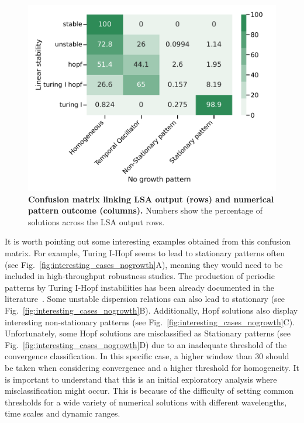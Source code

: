 \begin{figure}[H] %
    \centering
    \includegraphics[width=1\textwidth]{chapters/Chapter 1/lsa_vs_numerical_confusion_variant0-11-12} %
    \caption{\textbf{Confusion matrix linking LSA output (rows) and numerical pattern outcome (columns).} Numbers show the percentage of solutions across the LSA output rows.}
    \label{fig:lsa_numerical_confusion} %
\end{figure}

It is worth pointing out some interesting examples obtained from this confusion matrix.
For example, Turing I-Hopf seems to lead to stationary patterns often (see Fig.~\ref{fig:interesting_cases_nogrowth}A), meaning they would need to be included in high-throughput robustness studies.
The production of periodic patterns by Turing I-Hopf instabilities has been already documented in the literature~\cite{Liu2007}.
Some unstable dispersion relations can also lead to stationary (see Fig.~\ref{fig:interesting_cases_nogrowth}B).
Additionally, Hopf solutions also display interesting non-stationary patterns (see Fig.~\ref{fig:interesting_cases_nogrowth}C).
Unfortunately, some Hopf solutions are misclassified as Stationary patterns (see Fig.~\ref{fig:interesting_cases_nogrowth}D) due to an inadequate threshold of the convergence classification.
In this specific case, a higher window than 30 should be taken when considering convergence and a higher threshold for homogeneity.
It is important to understand that this is an initial exploratory analysis where misclassification might occur.
This is because of the difficulty of setting common thresholds for a wide variety of numerical solutions with different wavelengths, time scales and dynamic ranges.

